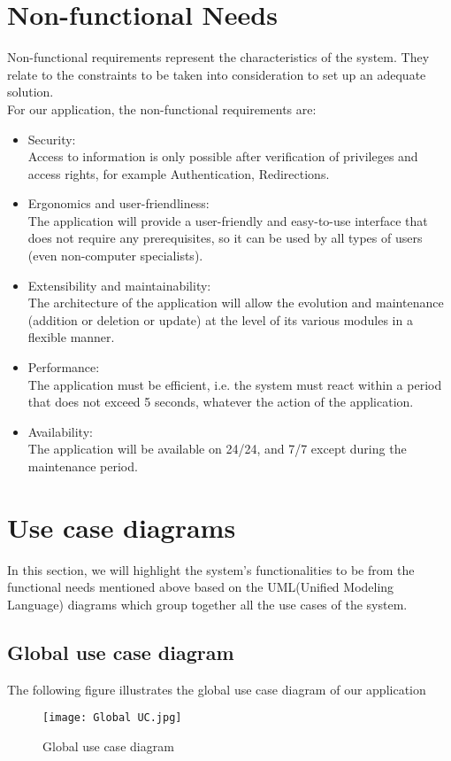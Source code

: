 \section{Non-functional Needs}
Non-functional requirements represent the characteristics of the system.
They relate to the constraints to be taken into consideration to set up
an adequate solution.\\
For our application, the non-functional requirements are:
\begin{itemize}
\item Security:\\
Access to information is only possible after verification of privileges and access rights,
for example Authentication, Redirections.

\item Ergonomics and user-friendliness:\\
The application will provide a user-friendly and easy-to-use interface that does not
require any prerequisites, so it can be used by all types of users (even non-computer specialists).

\item Extensibility and maintainability:\\
The architecture of the application will allow the evolution and maintenance (addition
or deletion or update) at the level of its various modules in a flexible manner.

\item Performance:\\
The application must be efficient, i.e. the system must react within a period that does
not exceed 5 seconds, whatever the action of the application.

\item Availability:\\
The application will be available on 24/24, and 7/7 except during the maintenance period.

\end{itemize}
\section{Use case diagrams}
In this section, we will highlight the system's functionalities to be
from the functional needs mentioned above based on the UML(Unified Modeling Language) diagrams which group together all the use cases of the system.
\subsection{Global use case diagram}
The following figure illustrates the global use case diagram of our application
\begin{figure}[H]%
    \center   
    \texttt{[image: Global UC.jpg]}
    \caption{Global use case diagram}
\end{figure}
